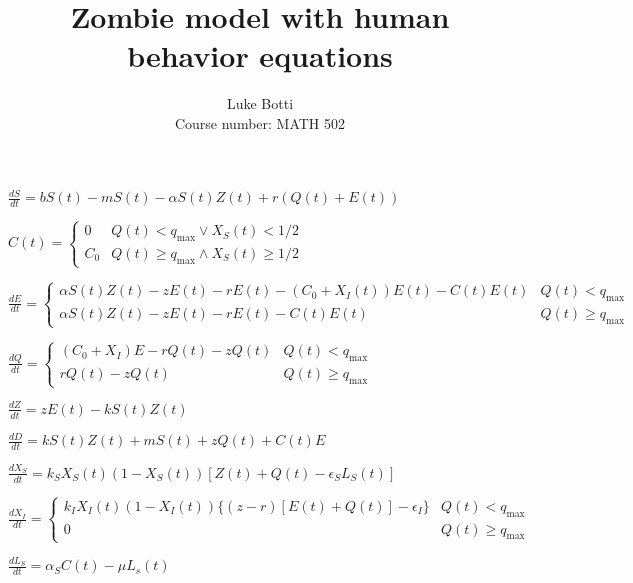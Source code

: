 \documentclass[12pt]{article}
\begin{document}
 
\title{Zombie model with human behavior equations}
\author{Luke Botti\\
Course number: MATH 502}
\maketitle
 
$\frac{dS}{dt} = bS(t) - mS(t) -\alpha S(t)Z(t) + r(Q(t)+E(t))$

$C(t) = \begin{cases}
	0 & Q(t) < q_{\text{max}} \vee X_S(t) < 1/2 \\
	C_0 & Q(t) \geq q_{\text{max}} \wedge X_S(t) \geq 1/2
\end{cases}$

$\frac{dE}{dt} = \begin{cases} 
      \alpha S(t)Z(t) - zE(t) -rE(t) - (C_0 + X_I(t))E(t) - C(t) E(t) & Q(t) < q_{\text{max}} \\
      \alpha S(t)Z(t) - zE(t) -rE(t) - C(t) E(t) & Q(t) \geq q_{\text{max}}
   \end{cases}
$

$\frac{dQ}{dt} = \begin{cases}
	(C_0 + X_I)E - rQ(t) - zQ(t) & Q(t) < q_{\text{max}}\\
	rQ(t) - zQ(t) & Q(t) \geq q_{\text{max}}
\end{cases}$

$\frac{dZ}{dt} = zE(t) -kS(t)Z(t)$

$\frac{dD}{dt} = kS(t)Z(t) + mS(t) + zQ(t) + C(t)E$

$\frac{dX_S}{dt} = k_S X_S(t) (1 - X_S(t))[Z(t) + Q(t) - \epsilon_S L_S(t)]$

$\frac{dX_I}{dt} = \begin{cases}
	k_I X_I(t) (1 - X_I(t))\{(z-r)[E(t) + Q(t)] - \epsilon_I\} & Q(t) < q_{\text{max}} \\
	0 & Q(t) \geq q_{\text{max}}
\end{cases}$

$\frac{dL_S}{dt} = \alpha_S C(t) - \mu L_s(t)$
\end{document}
